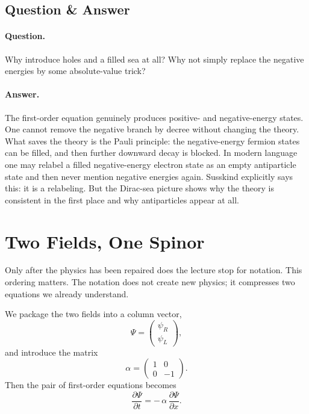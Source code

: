 \subsection{Question \& Answer}

\paragraph{Question.} Why introduce holes and a filled sea at all? Why not simply replace the negative energies by some absolute-value trick?

\paragraph{Answer.} The first-order equation genuinely produces positive- and negative-energy states. One cannot remove the negative branch by decree without changing the theory. What saves the theory is the Pauli principle: the negative-energy fermion states can be filled, and then further downward decay is blocked. In modern language one may relabel a filled negative-energy electron state as an empty antiparticle state and then never mention negative energies again. Susskind explicitly says this: it is a relabeling. But the Dirac-sea picture shows why the theory is consistent in the first place and why antiparticles appear at all.

\section{Two Fields, One Spinor}

Only after the physics has been repaired does the lecture stop for notation. This ordering matters. The notation does not create new physics; it compresses two equations we already understand.

We package the two fields into a column vector,
\begin{equation}
\Psi=\begin{pmatrix}\psi_R\\ \psi_L\end{pmatrix},
\end{equation}
and introduce the matrix
\begin{equation}
\alpha=\begin{pmatrix}1&0\\0&-1\end{pmatrix}.
\end{equation}
Then the pair of first-order equations becomes
\begin{equation}
\frac{\partial \Psi}{\partial t}
=
-\,\alpha\,\frac{\partial \Psi}{\partial x}.
\end{equation}

